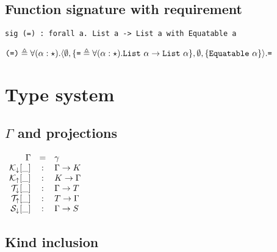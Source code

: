 \documentclass{article}[11pt]
\newcommand{\term}[1]{\verb~#1~}
\begin{document}
    \subsection{Function signature with requirement}\label{subsec:function-signature-with-requirement}

    \begin{verbatim}
sig (=) : forall a. List a -> List a with Equatable a
    \end{verbatim}

    \noindent
    \begin{math}
        \term{(=)} \triangleq \forall(\alpha:\star).\langle
        \emptyset,
        \{ \term{=} \triangleq \forall(\alpha:\star).\term{List}~\alpha \rightarrow \term{List}~\alpha  \},
        \emptyset,
        \{ \term{Equatable} ~ \alpha \}
        \rangle.\term{=}
    \end{math}


    \section{Type system}\label{sec:type-system}

    \subsection{$\Gamma$ and projections}\label{subsec:gamma-and-projections}

    \begin{math}
        \begin{array}{rcl}
            \Gamma                  & = & \gamma \\
            {\cal K}_\downarrow[\_] & : & \Gamma \rightarrow K \\
            {\cal K}_\uparrow[\_]   & : & K \rightarrow \Gamma \\
            {\cal T}_\downarrow[\_] & : & \Gamma \rightarrow T \\
            {\cal T}_\uparrow[\_]   & : & T \rightarrow \Gamma \\
            {\cal S}_\downarrow[\_] & : & \Gamma \rightarrow S \\
        \end{array}
    \end{math}

    \subsection{Kind inclusion}\label{subsec:kind-inclusion}
\end{document}
